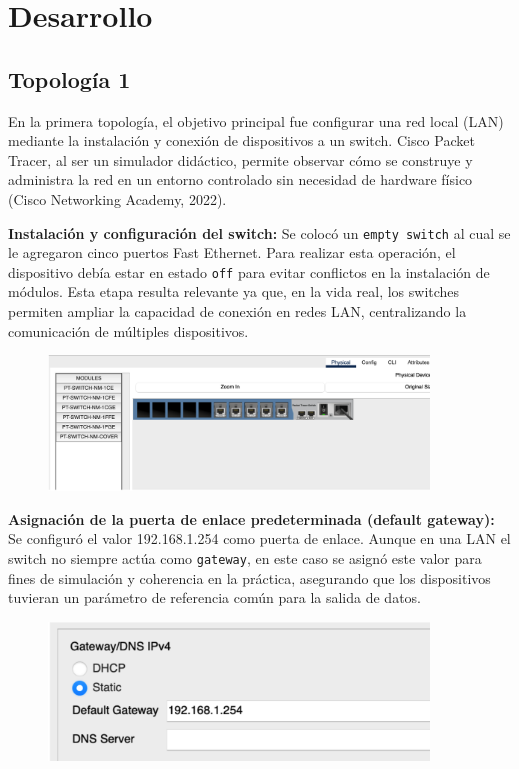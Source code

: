 \documentclass[letterpaper,12pt,oneside]{article}
\begin{document}
\section{Desarrollo}
\subsection*{Topología 1}
En la primera topología, el objetivo principal fue configurar una red local (LAN) mediante la instalación y conexión de dispositivos a un switch. Cisco Packet Tracer, al ser un simulador didáctico, permite observar cómo se construye y administra la red en un entorno controlado sin necesidad de hardware físico (Cisco Networking Academy, 2022).

\textbf{Instalación y configuración del switch:}
Se colocó un \texttt{empty switch} al cual se le agregaron cinco puertos Fast Ethernet. Para realizar esta operación, el dispositivo debía estar en estado \texttt{off} para evitar conflictos en la instalación de módulos. Esta etapa resulta relevante ya que, en la vida real, los switches permiten ampliar la capacidad de conexión en redes LAN, centralizando la comunicación de múltiples dispositivos.
\begin{figure}[h!]
    \centering
    \includegraphics[width=0.9\textwidth]{1.png}
\end{figure}

\textbf{Asignación de la puerta de enlace predeterminada (default gateway):}
Se configuró el valor 192.168.1.254 como puerta de enlace. Aunque en una LAN el switch no siempre actúa como \texttt{gateway}, en este caso se asignó este valor para fines de simulación y coherencia en la práctica, asegurando que los dispositivos tuvieran un parámetro de referencia común para la salida de datos.
\begin{figure}[h!]
    \centering
    \includegraphics[width=0.9\textwidth]{2.png}
\end{figure}
\end{document}
